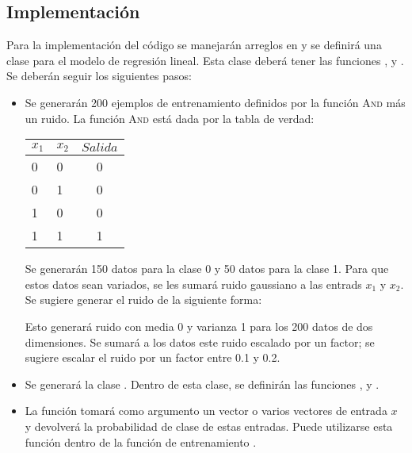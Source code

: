 \subsection{Implementación}

Para la implementación del código se manejarán arreglos en  y se definirá una clase para el modelo de regresión lineal. Esta clase deberá tener las funciones ,  y . Se deberán seguir los siguientes pasos:


\begin{itemize}
    \item Se generarán 200 ejemplos de entrenamiento definidos por la función \textsc{And} más un ruido. La función \textsc{And} está dada por la tabla de verdad:
    \begin{center}
        \begin{tabular}{ l l | c }
          $x_1$ & $x_2$ & $Salida$\\ \hline
          0 & 0  & 0 \\ \hline
          0 & 1 &  0  \\ \hline
          1 & 0 & 0  \\ \hline
          1 & 1 & 1  \\
        \end{tabular}
    \end{center}
    Se generarán 150 datos para la clase 0 y 50 datos para la clase 1. Para que estos datos sean variados, se les sumará ruido gaussiano a las entrads $x_1$ y $x_2$. Se sugiere generar el ruido de la siguiente forma:
    \begin{center}
    \end{center}
    Esto generará ruido con media 0 y varianza 1 para los 200 datos de dos dimensiones. Se sumará a los datos este ruido escalado por un factor; se sugiere escalar el ruido por un factor entre 0.1 y 0.2.

    \item Se generará la clase . Dentro de esta clase, se definirán las funciones ,  y .

    \item La función  tomará como argumento un vector o varios vectores de entrada $x$ y devolverá la probabilidad de clase de estas entradas. Puede utilizarse esta función dentro de la función de entrenamiento .


\end{itemize}
